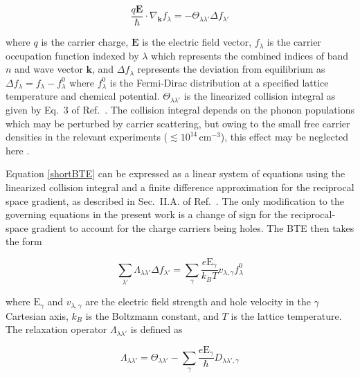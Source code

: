 \documentclass[aps,prx,preprint,letterpaper,groupedaddress,longbibliography]{revtex4-2}
\theoremstyle{definition}
\newcommand{\qnumber}{\lambda}
\newcommand{\qnumberp}{\lambda'}
\newcommand{\qnumbertext}{\lambda}
\begin{document}
\begin{equation}
    {
        \frac{q\mathbf{E}}{\hbar}
        \cdot
        \nabla_\mathbf{k}
        f_{\qnumber}
        =
        -\Theta_{\qnumber\qnumberp}
        \Delta f_{\qnumberp}
    }
    \label{shortBTE}
\end{equation} 

\noindent where $q$ is the carrier charge, $\mathbf{E}$ is the electric field vector, $f_{\qnumber}$ is the carrier occupation function indexed by $\qnumbertext$ which represents the combined indices of band $n$ and wave vector $\mathbf{k}$, and $\Delta f_{\qnumber}$ represents the deviation from equilibrium as $\Delta f_{\qnumber}=f_{\qnumber}-f^0_{\qnumber}$ where $f^0_{\qnumber}$ is the Fermi-Dirac distribution at a specified lattice temperature and chemical potential.  $\Theta_{\qnumber\qnumberp}$ is the linearized collision integral as given by Eq.~3 of Ref.~\cite{Choi:2021}. The collision integral depends on the phonon populations which may be perturbed by carrier scattering, but owing to the small free carrier densities in the relevant experiments ($\lesssim10^{14}\,\mathrm{cm}^{-3}$), this effect may be neglected here \cite{Ottaviani:1975}.


Equation \ref{shortBTE} can be expressed as a linear system of equations using the linearized collision integral and a finite difference approximation for the reciprocal space gradient, as described in Sec.~II.A. of Ref.~\cite{Choi:2021}. The only modification to the governing equations in the present work is a change of sign for the reciprocal-space gradient to account for the charge carriers being holes. The BTE then takes the form

\begin{equation}
    {
        \sum_{\qnumberp}
        \Lambda_{\qnumber\qnumberp}
        \Delta f_{\qnumberp}
        =\sum_\gamma
        \frac{e\mathrm{E}_\gamma}{k_BT}
        v_{\qnumber,\gamma}
        f^0_\qnumber
    }
    \label{fullBTE}
\end{equation}

\noindent where $\mathrm{E}_\gamma$ and $v_{\qnumber,\gamma}$ are the electric field strength and hole velocity in the $\gamma$ Cartesian axis, $k_B$ is the Boltzmann constant, and $T$ is the lattice temperature. The relaxation operator $\Lambda_{\qnumber\qnumberp}$ is defined as

\begin{equation}
    {
        \Lambda_{\qnumber\qnumberp}
        =
        \Theta_{\qnumber\qnumberp}
        -\sum_\gamma
        \frac{e\mathrm{E}_\gamma}{\hbar}
        D_{\qnumber\qnumberp,\gamma}
    }
    \label{relop}
\end{equation}
\end{document}
